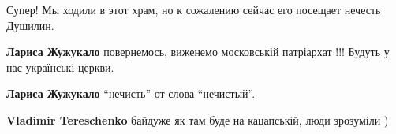  
 
 
 
 

\qqSecCmt

\begin{itemize} %

Супер! Мы ходили в этот храм, но к сожалению сейчас его посещает нечесть Душилин.

\textbf{Лариса Жужукало} повернемось, виженемо московській патріархат !!! Будуть у нас українські церкви.

\textbf{Лариса Жужукало} \enquote{нечисть} от слова \enquote{нечистый}.

\textbf{Vladimir Tereschenko} байдуже як там буде на кацапській, люди зрозуміли )
\end{itemize} %
